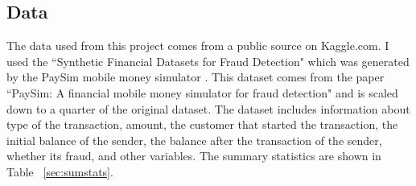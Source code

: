 \documentclass[midd]{thesis}
\begin{document}
\subsection{Data}

The data used from this project comes from a public source on Kaggle.com. I used the ``Synthetic Financial Datasets for Fraud Detection" which was generated by the PaySim mobile money simulator \cite{paysim}. This dataset comes from the paper ``PaySim: A financial mobile money simulator for fraud detection" and is scaled down to a quarter of the original dataset. The dataset includes information about type of the transaction, amount, the customer that started the transaction, the initial balance of the sender, the balance after the transaction of the sender, whether its fraud, and other variables. The summary statistics are shown in Table ~\ref{sec:sumstats}. 

\end{document}
